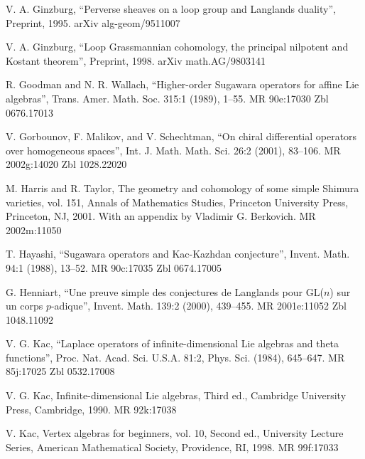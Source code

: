 \par\noindent [Ginzburg 1995] V. A. Ginzburg, ``Perverse sheaves on a loop group and Langlands duality'', Preprint, 1995. arXiv alg-geom/9511007

\par\noindent [Ginzburg 1998] V. A. Ginzburg, ``Loop Grassmannian cohomology, the principal nilpotent and Kostant theorem'', Preprint, 1998. arXiv math.AG/9803141

\par{} R. Goodman and N. R. Wallach, ``Higher-order Sugawara operators for affine Lie algebras'', Trans. Amer. Math. Soc. 315:1 (1989), 1--55. MR 90e:17030 Zbl 0676.17013

\par\noindent [Gorbounov et al. 2001] V. Gorbounov, F. Malikov, and V. Schechtman, ``On chiral differential operators over homogeneous spaces'', Int. J. Math. Math. Sci. 26:2 (2001), 83--106. MR 2002g:14020 Zbl 1028.22020

\par{} M. Harris and R. Taylor, The geometry and cohomology of some simple Shimura varieties, vol. 151, Annals of Mathematics Studies, Princeton University Press, Princeton, NJ, 2001. With an appendix by Vladimir G. Berkovich. MR 2002m:11050

\par\noindent [Hayashi 1988] T. Hayashi, ``Sugawara operators and Kac-Kazhdan conjecture'', Invent. Math. 94:1 (1988), 13--52. MR 90c:17035 Zbl 0674.17005

\par\noindent [Henniart 2000] G. Henniart, ``Une preuve simple des conjectures de Langlands pour GL($n$) sur un corps $p$-adique'', Invent. Math. 139:2 (2000), 439--455. MR 2001e:11052 Zbl 1048.11092

\par\noindent [Kac 1984] V. G. Kac, ``Laplace operators of infinite-dimensional Lie algebras and theta functions'', Proc. Nat. Acad. Sci. U.S.A. 81:2, Phys. Sci. (1984), 645--647. MR 85j:17025 Zbl 0532.17008

\par\noindent [Kac 1990] V. G. Kac, Infinite-dimensional Lie algebras, Third ed., Cambridge University Press, Cambridge, 1990. MR 92k:17038

\par\noindent [Kac 1998] V. Kac, Vertex algebras for beginners, vol. 10, Second ed., University Lecture Series, American Mathematical Society, Providence, RI, 1998. MR 99f:17033

